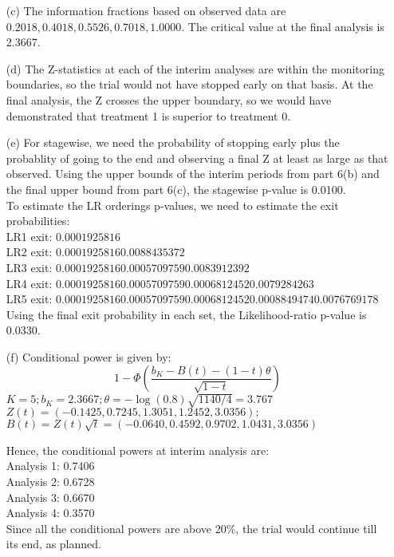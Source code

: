 \documentclass[11pt,a4paper]{article}
\begin{document}
\begin{enumerate}
\begin{enumerate}
\item[(c)] The information fractions based on observed data are $0.2018, 0.4018, 0.5526, 0.7018, 1.0000$. The critical value at the final analysis is 2.3667.

\item[(d)] The Z-statistics at each of the interim analyses are within the monitoring boundaries, so the trial would not have stopped early on that basis. At the final analysis, the Z crosses the upper boundary, so we would have demonstrated that treatment 1 is superior to treatment 0.

\item[(e)] For stagewise, we need the probability of stopping early plus the probablity of going to the end and observing a final Z at least as large as that observed. Using the upper bounds of the interim periods from part 6(b) and the final upper bound from part 6(c), the stagewise p-value is 0.0100. \\

To estimate the LR orderings p-values, we need to estimate the exit probabilities: \\
LR1 exit: $0.0001925816$\\
LR2 exit: $0.0001925816 0.0088435372$\\
LR3 exit: $0.0001925816 0.0005709759 0.0083912392$\\
LR4 exit: $0.0001925816 0.0005709759 0.0006812452 0.0079284263$\\
LR5 exit: $0.0001925816 0.0005709759 0.0006812452 0.0008849474 0.0076769178$\\
Using the final exit probability in each set, the Likelihood-ratio p-value is 0.0330. 

\item[(f)] Conditional power is given by:
\[ 1-\Phi \left(\dfrac{b_K-B(t)-(1-t)\theta}{\sqrt{1-t}}\right) \]
$K = 5; b_K = 2.3667; \theta = -\log(0.8)\sqrt{1140/4} = 3.767$ \\ 
$Z(t) = (-0.1425, 0.7245, 1.3051, 1.2452, 3.0356);$ \\
$B(t) = Z(t)\sqrt{t} = (-0.0640, 0.4592, 0.9702, 1.0431, 3.0356) $

Hence, the conditional powers at interim analysis are: \\
Analysis 1: 0.7406 \\
Analysis 2: 0.6728 \\
Analysis 3: 0.6670 \\
Analysis 4: 0.3570 \\

Since all the conditional powers are above 20\%, the trial would continue till its end, as planned. 

\end{enumerate}

\end{enumerate}
\end{document}
